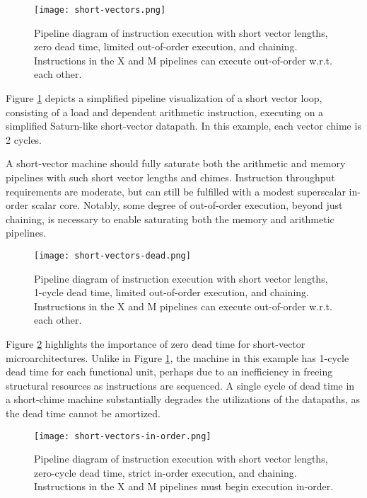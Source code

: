 \begin{figure}[h]
  \centering
  \texttt{[image: short-vectors.png]}
  \caption{Pipeline diagram of instruction execution with short vector lengths, zero dead time, limited out-of-order execution, and chaining. Instructions in the X and M pipelines can execute out-of-order w.r.t. each other.}
  \label{fig:short}
\end{figure}

Figure \ref{fig:short} depicts a simplified pipeline visualization of a short vector loop, consisting of a load and dependent arithmetic instruction, executing on a simplified Saturn-like short-vector datapath.
In this example, each vector chime is 2 cycles.


A short-vector machine should fully saturate both the arithmetic and memory pipelines with such short vector lengths and chimes.
Instruction throughput requirements are moderate, but can still be fulfilled with a modest superscalar in-order scalar core.
Notably, some degree of out-of-order execution, beyond just chaining, is necessary to enable saturating both the memory and arithmetic pipelines.

\begin{figure}[h]
  \centering
  \texttt{[image: short-vectors-dead.png]}
  \caption{Pipeline diagram of instruction execution with short vector lengths, 1-cycle dead time, limited out-of-order execution, and chaining. Instructions in the X and M pipelines can execute out-of-order w.r.t. each other.}
  \label{fig:short-dead}
\end{figure}



Figure \ref{fig:short-dead} highlights the importance of zero dead time for short-vector microarchitectures.
Unlike in Figure \ref{fig:short}, the machine in this example has 1-cycle dead time for each functional unit, perhaps due to an inefficiency in freeing structural resources as instructions are sequenced.
A single cycle of dead time in a short-chime machine substantially degrades the utilizations of the datapaths, as the dead time cannot be amortized. 


\begin{figure}[h]
  \centering
  \texttt{[image: short-vectors-in-order.png]}
  \caption{Pipeline diagram of instruction execution with short vector lengths, zero-cycle dead time, strict in-order execution, and chaining. Instructions in the X and M pipelines must begin execution in-order.}
  \label{fig:short-inorder}
\end{figure}

